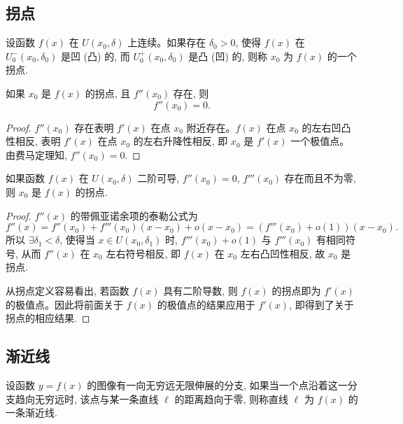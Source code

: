 \subsection{拐点}
\label{subsec:ma-5-4-4}

\begin{definition}\label{definition:ma-5-4-2}
设函数 $f(x)$ 在 $U(x_0,\delta)$ 上连续。如果存在 $\delta_0>0$, 使得 $f(x)$ 在 $U_0^-(x_0,\delta_0)$ 是凹 (凸) 的, 而 $U_0^+(x_0,\delta_0)$ 是凸 (凹) 的, 则称 $x_0$ 为 $f(x)$ 的一个拐点.
\end{definition}


\begin{theorem}\label{theorem:ma-5-4-6}
如果 $x_0$ 是 $f(x)$ 的拐点, 且 $f''(x_0)$ 存在, 则
\[
  f''(x_0)=0.
\]
\end{theorem}


\begin{proof}
$f''(x_0)$ 存在表明 $f'(x)$ 在点 $x_0$ 附近存在。$f(x)$ 在点 $x_0$ 的左右凹凸性相反, 表明 $f'(x)$ 在点 $x_0$ 的左右升降性相反, 即 $x_0$ 是 $f'(x)$ 一个极值点。由费马定理知, $f''(x_0)=0$.
\end{proof}


\begin{theorem}\label{theorem:ma-5-4-7}
如果函数 $f(x)$ 在 $U(x_0,\delta)$ 二阶可导, $f''(x_0)=0$, $f'''(x_0)$ 存在而且不为零, 则 $x_0$ 是 $f(x)$ 的拐点.
\end{theorem}


\begin{proof}
$f''(x)$ 的带佩亚诺余项的泰勒公式为
\[
  f''(x)=f''(x_0)+f'''(x_0)(x-x_0)+o(x-x_0)
  =(f'''(x_0)+o(1))(x-x_0).
\]
所以 $\exists\delta_1<\delta$, 使得当 $x\in U(x_0,\delta_1)$ 时, $f'''(x_0)+o(1)$ 与 $f'''(x_0)$ 有相同符号, 从而 $f''(x)$ 在 $x_0$ 左右符号相反, 即 $f(x)$ 在 $x_0$ 左右凸凹性相反, 故 $x_0$ 是拐点.

从拐点定义容易看出, 若函数 $f(x)$ 具有二阶导数, 则 $f(x)$ 的拐点即为 $f'(x)$ 的极值点。因此将前面关于 $f(x)$ 的极值点的结果应用于 $f'(x)$, 即得到了关于拐点的相应结果.
\end{proof}


\subsection{渐近线}
\label{subsec:ma-5-4-5}

设函数 $y=f(x)$ 的图像有一向无穷远无限伸展的分支, 如果当一个点沿着这一分支趋向无穷远时, 该点与某一条直线 $\ell$ 的距离趋向于零, 则称直线 $\ell$ 为 $f(x)$ 的一条渐近线.

